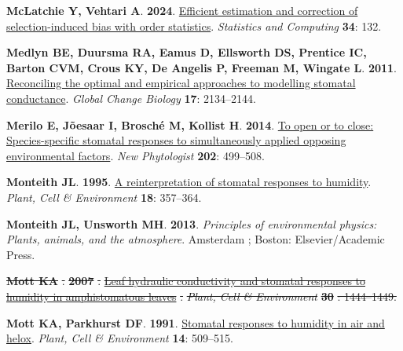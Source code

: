 \documentclass[
  letterpaper,
  DIV=11,
  numbers=noendperiod]{scrartcl}
\newlength{\cslhangindent}
\newenvironment{CSLReferences}[2] %
 {\begin{list}{}{%
  \setlength{\itemindent}{0pt}
  \setlength{\leftmargin}{0pt}
  \setlength{\parsep}{0pt}
  \ifodd #1
   \setlength{\leftmargin}{\cslhangindent}
   \setlength{\itemindent}{-1\cslhangindent}
  \fi
  \setlength{\itemsep}{#2\baselineskip}}}
 {\end{list}}
\providecommand{\DIFdeltex}[1]{{\protect\color{red}\sout{#1}}}                      %
\providecommand{\DIFdelbegin}{} %
\providecommand{\DIFdelend}{} %
\providecommand{\DIFdel}[1]{\texorpdfstring{\DIFdeltex{#1}}{}} %
\newcommand{\DIFscaledelfig}{0.5}
\newlength{\DIFdelgraphicswidth} %
\newlength{\DIFdelgraphicsheight} %
\newcommand{\DIFdelincludegraphics}[2][]{%
\sbox{\DIFdelgraphicsbox}{\DIFOincludegraphics[#1]{#2}}%
\settoboxwidth{\DIFdelgraphicswidth}{\DIFdelgraphicsbox} %
\settoboxtotalheight{\DIFdelgraphicsheight}{\DIFdelgraphicsbox} %
\scalebox{\DIFscaledelfig}{%
\parbox[b]{\DIFdelgraphicswidth}{\usebox{\DIFdelgraphicsbox}\\[-\baselineskip] \rule{\DIFdelgraphicswidth}{0em}}\llap{\resizebox{\DIFdelgraphicswidth}{\DIFdelgraphicsheight}{%
\setlength{\unitlength}{\DIFdelgraphicswidth}%
\begin{picture}(1,1)%
\thicklines\linethickness{2pt} %
{\color[rgb]{1,0,0}\put(0,0){\framebox(1,1){}}}%
{\color[rgb]{1,0,0}\put(0,0){\line( 1,1){1}}}%
{\color[rgb]{1,0,0}\put(0,1){\line(1,-1){1}}}%
\end{picture}%
}\hspace*{3pt}}} %
} %
\DeclareRobustCommand{\DIFdelbegin}{\DIFOdelbegin \let\includegraphics\DIFdelincludegraphics} %
\DeclareRobustCommand{\DIFdelend}{\DIFOaddend \let\includegraphics\DIFOincludegraphics} %
\begin{document}
\begin{CSLReferences}{0}{1}
\textbf{\textbf{McLatchie Y}, \textbf{Vehtari A}}. \textbf{2024}.
\href{https://doi.org/10.1007/s11222-024-10442-4}{Efficient estimation
and correction of selection-induced bias with order statistics}.
\emph{Statistics and Computing} \textbf{34}: 132.

\textbf{\textbf{Medlyn BE}, \textbf{Duursma RA}, \textbf{Eamus D},
\textbf{Ellsworth DS}, \textbf{Prentice IC}, \textbf{Barton CVM},
\textbf{Crous KY}, \textbf{De Angelis P}, \textbf{Freeman M},
\textbf{Wingate L}}. \textbf{2011}.
\href{https://doi.org/10.1111/j.1365-2486.2010.02375.x}{Reconciling the
optimal and empirical approaches to modelling stomatal conductance}.
\emph{Global Change Biology} \textbf{17}: 2134--2144.

\textbf{\textbf{Merilo E}, \textbf{Jõesaar I}, \textbf{Brosché M},
\textbf{Kollist H}}. \textbf{2014}.
\href{https://doi.org/10.1111/nph.12667}{To open or to close:
Species-specific stomatal responses to simultaneously applied opposing
environmental factors}. \emph{New Phytologist} \textbf{202}: 499--508.

\textbf{\textbf{Monteith JL}}. \textbf{1995}.
\href{https://doi.org/10.1111/j.1365-3040.1995.tb00371.x}{A
reinterpretation of stomatal responses to humidity}. \emph{Plant, Cell
\& Environment} \textbf{18}: 357--364.

\textbf{\textbf{Monteith JL}, \textbf{Unsworth MH}}. \textbf{2013}.
\emph{Principles of environmental physics: Plants, animals, and the
atmosphere}. Amsterdam ; Boston: Elsevier/Academic Press.

\DIFdelbegin {}
\textbf{\textbf{\DIFdel{Mott KA}}%
}%
\DIFdel{. }\textbf{\DIFdel{2007}}%
\DIFdel{.
}\href{https://doi.org/10.1111/j.1365-3040.2007.01720.x}{\DIFdel{Leaf hydraulic
conductivity and stomatal responses to humidity in amphistomatous
leaves}}%
\DIFdel{. }\emph{\DIFdel{Plant, Cell \& Environment}} %
\textbf{\DIFdel{30}}%
\DIFdel{: 1444--1449.
}%

\DIFdelend {}
\textbf{\textbf{Mott KA}, \textbf{Parkhurst DF}}. \textbf{1991}.
\href{https://doi.org/10.1111/j.1365-3040.1991.tb01521.x}{Stomatal
responses to humidity in air and helox}. \emph{Plant, Cell \&
Environment} \textbf{14}: 509--515.


\end{CSLReferences}
\end{document}
